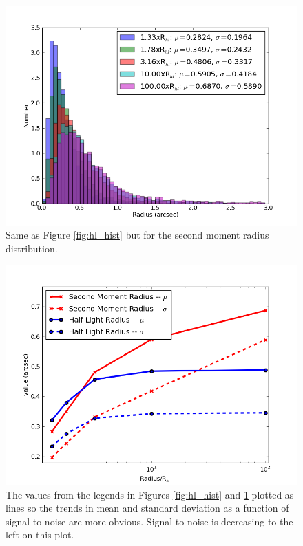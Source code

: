 \documentclass[]{article}
\begin{document}
{\begin{figure}[H]
\includegraphics[width=5in]{validation_figures/Second_moment_hist.png}
\caption{Same as Figure \ref{fig:hl_hist} but for the second moment radius distribution.\label{fig:mom_hist}}
\end{figure}
\begin{figure}[H]
\centering
\includegraphics[width=5in]{validation_figures/sec_mom_half_light_mean_sigma.png}
\caption{The values from the legends in Figures \ref{fig:hl_hist} and \ref{fig:mom_hist} plotted as lines so the trends in mean and standard deviation as a function 
of signal-to-noise are more obvious.  Signal-to-noise is decreasing to the left on this plot.\label{fig:mom_hl_line}}
\end{figure}

}
\end{document}
